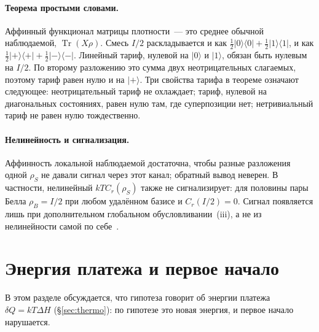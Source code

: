 \documentclass[11pt,a4paper]{article}
\newcommand{\Sref}[1]{\hyperref[#1]{\S\ref{#1}}}
\begin{document}
\paragraph{Теорема простыми словами.}
Аффинный функционал матрицы плотности~--- это среднее обычной наблюдаемой, $\operatorname{Tr}(X\rho)$. Смесь $I/2$ раскладывается и как $\tfrac12|0\rangle\langle0|+\tfrac12|1\rangle\langle1|$, и как $\tfrac12|{+}\rangle\langle{+}|+\tfrac12|{-}\rangle\langle{-}|$. Линейный тариф, нулевой на $|0\rangle$ и $|1\rangle$, обязан быть нулевым на $I/2$. По второму разложению это сумма двух неотрицательных слагаемых, поэтому тариф равен нулю и на $|{+}\rangle$. Три свойства тарифа в теореме означают следующее: неотрицательный тариф не охлаждает; тариф, нулевой на диагональных состояниях, равен нулю там, где суперпозиции нет; нетривиальный тариф не равен нулю тождественно.

\paragraph{Нелинейность и сигнализация.}
Аффинность локальной наблюдаемой достаточна, чтобы разные разложения одной $\rho_S$ не давали сигнал через этот канал; обратный вывод неверен. В частности, нелинейный $kT C_r(\rho_S)$ также не сигнализирует: для половины пары Белла $\rho_B=I/2$ при любом удалённом базисе и $C_r(I/2)=0$. Сигнал появляется лишь при дополнительном глобальном обусловливании~(iii), а не из нелинейности самой по себе~\cite{gisin1989,gisin1990,polchinski1991,hjw1993}.

\section{Энергия платежа и первое начало}\label{sec:origin}

В этом разделе обсуждается, что гипотеза говорит об энергии платежа $\delta Q = kT\Delta H$ (\Sref{sec:thermo}): по гипотезе это новая энергия, и первое начало нарушается.
\end{document}
